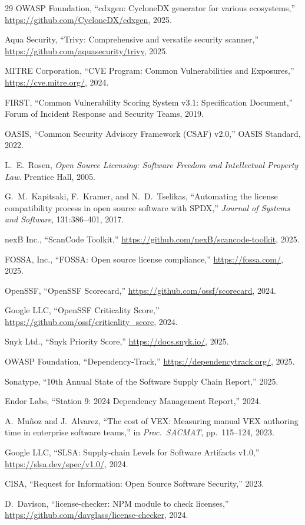 \documentclass[11pt,twocolumn]{article}
\begin{document}
\begin{thebibliography}{29}
OWASP Foundation,
``cdxgen: CycloneDX generator for various ecosystems,''
\url{https://github.com/CycloneDX/cdxgen}, 2025.

Aqua Security,
``Trivy: Comprehensive and versatile security scanner,''
\url{https://github.com/aquasecurity/trivy}, 2025.

MITRE Corporation,
``CVE Program: Common Vulnerabilities and Exposures,''
\url{https://cve.mitre.org/}, 2024.

FIRST,
``Common Vulnerability Scoring System v3.1: Specification Document,''
Forum of Incident Response and Security Teams, 2019.

OASIS,
``Common Security Advisory Framework (CSAF) v2.0,''
OASIS Standard, 2022.

L.\ E.\ Rosen,
\emph{Open Source Licensing: Software Freedom and Intellectual Property Law}.
Prentice Hall, 2005.

G.\ M.\ Kapitsaki, F.\ Kramer, and N.\ D.\ Tselikas,
``Automating the license compatibility process in open source software with SPDX,''
\emph{Journal of Systems and Software}, 131:386--401, 2017.

nexB Inc.,
``ScanCode Toolkit,''
\url{https://github.com/nexB/scancode-toolkit}, 2025.

FOSSA, Inc.,
``FOSSA: Open source license compliance,''
\url{https://fossa.com/}, 2025.

OpenSSF,
``OpenSSF Scorecard,''
\url{https://github.com/ossf/scorecard}, 2024.

Google LLC,
``OpenSSF Criticality Score,''
\url{https://github.com/ossf/criticality_score}, 2024.

Snyk Ltd.,
``Snyk Priority Score,''
\url{https://docs.snyk.io/}, 2025.

OWASP Foundation,
``Dependency-Track,''
\url{https://dependencytrack.org/}, 2025.

Sonatype,
``10th Annual State of the Software Supply Chain Report,'' 2025.

Endor Labs,
``Station 9: 2024 Dependency Management Report,'' 2024.

A.\ Mu\~{n}oz and J.\ Alvarez,
``The cost of VEX: Measuring manual VEX authoring time in enterprise software teams,''
in \emph{Proc.\ SACMAT}, pp.\ 115--124, 2023.

Google LLC,
``SLSA: Supply-chain Levels for Software Artifacts v1.0,''
\url{https://slsa.dev/spec/v1.0/}, 2024.

CISA,
``Request for Information: Open Source Software Security,'' 2023.

D.\ Davison,
``license-checker: NPM module to check licenses,''
\url{https://github.com/davglass/license-checker}, 2024.

\end{thebibliography}
\end{document}
